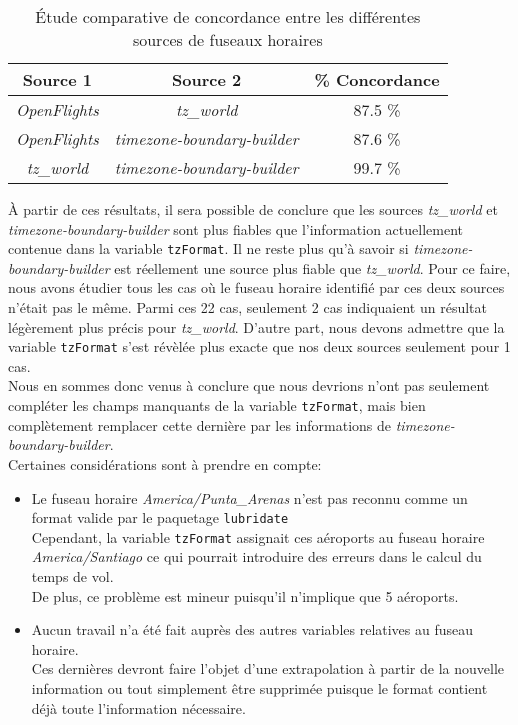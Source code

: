 \begin{table}
	\centering
	\begin{tabular}{ccc}
		\textbf{Source 1} & \textbf{Source 2} & \textbf{\% Concordance} \\
		\hline
		\emph{OpenFlights} & \emph{tz\_world} & 87.5 \% \\
		\emph{OpenFlights} & \emph{{timezone-boundary-builder}} & 87.6 \% \\
		\emph{tz\_world} & \emph{{timezone-boundary-builder}} & 99.7 \%	
	\end{tabular}
	\caption{Étude comparative de concordance entre les différentes sources de fuseaux horaires}
	\label{tab:tzConsistency}
\end{table}

À partir de ces résultats, il sera possible de conclure que les sources \emph{tz\_world} et \emph{{timezone-boundary-builder}} sont plus fiables que l'information actuellement contenue dans la variable \texttt{tzFormat}. Il ne reste plus qu'à savoir si \emph{{timezone-boundary-builder}} est réellement une source plus fiable que \emph{tz\_world}. Pour ce faire, nous avons étudier tous les cas où le fuseau horaire identifié par ces deux sources n'était pas le même. Parmi ces 22 cas, seulement 2 cas indiquaient un résultat légèrement plus précis pour \emph{tz\_world}. D'autre part, nous devons admettre que la variable \texttt{tzFormat} s'est révèlée plus exacte que nos deux sources seulement pour 1 cas. \\

Nous en sommes donc venus à conclure que nous devrions n'ont pas seulement compléter les champs manquants de la variable \texttt{tzFormat}, mais bien complètement remplacer cette dernière par les informations de \emph{{timezone-boundary-builder}}. \\

Certaines considérations sont à prendre en compte:
\begin{itemize}
	\item Le fuseau horaire \emph{{America/Punta\_Arenas}} n'est pas reconnu comme un format valide par le paquetage \texttt{lubridate} \\
	Cependant, la variable \texttt{tzFormat} assignait ces aéroports au fuseau horaire \emph{America/Santiago} ce qui pourrait introduire des erreurs dans le calcul du temps de vol. \cite{timeanddate} \\
	De plus, ce problème est mineur puisqu'il n'implique que 5 aéroports.
	\item Aucun travail n'a été fait auprès des autres variables relatives au fuseau horaire. \\
	Ces dernières devront faire l'objet d'une extrapolation à partir de la nouvelle information ou tout simplement être supprimée puisque le format contient déjà toute l'information nécessaire.
\end{itemize}
\vspace{\baselineskip}

